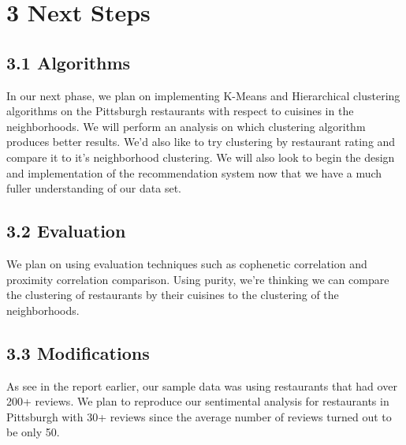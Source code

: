 \documentclass{neu_handout}
\begin{document}
\section*{3 Next Steps}
\subsection*{3.1 Algorithms}
In our next phase, we plan on implementing K-Means and Hierarchical clustering algorithms on the Pittsburgh restaurants with respect to cuisines in the neighborhoods. We will perform an analysis on which clustering algorithm produces better results. We'd also like to try clustering by restaurant rating and compare it to it's neighborhood clustering. We will also look to begin the design and implementation of the recommendation system now that we have a much fuller understanding of our data set. 

\subsection*{3.2 Evaluation}
We plan on using evaluation techniques such as cophenetic correlation and proximity correlation comparison. Using purity, we're thinking we can compare the clustering of restaurants by their cuisines to the clustering of the neighborhoods. 

\subsection*{3.3 Modifications}
As see in the report earlier, our sample data was using restaurants that had over 200+ reviews. We plan to reproduce our sentimental analysis for restaurants in Pittsburgh with 30+ reviews since the average number of reviews turned out to be only 50. 
\end{document}
